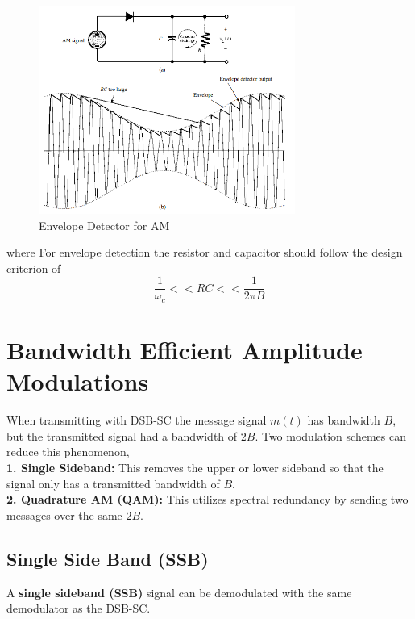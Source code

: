 \documentclass{article}
\begin{document}
    \begin{figure}[h]
        \centering
        \includegraphics[width=0.75\textwidth]{env_det}
        \caption{Envelope Detector for AM}
    \end{figure}
    where 
    For envelope detection the resistor and capacitor should follow the design criterion of
    \begin{equation}
        \frac{1}{\omega_c} << RC << \frac{1}{2\pi B}
    \end{equation}

    \section{Bandwidth Efficient Amplitude Modulations}
    When transmitting with DSB-SC the message signal $m(t)$ has bandwidth $B$, but the transmitted signal had a bandwidth of $2B$. Two modulation schemes 
    can reduce this phenomenon, \\
    \textbf{1. Single Sideband:} This removes the upper or lower sideband so that the signal only has a transmitted bandwidth of $B$.\\
    \textbf{2. Quadrature AM (QAM):} This utilizes spectral redundancy by sending two messages over the same $2B$.

    \subsection{Single Side Band (SSB)}
    A \textbf{single sideband (SSB)} signal can be demodulated with the same demodulator as the DSB-SC. 
\end{document}
